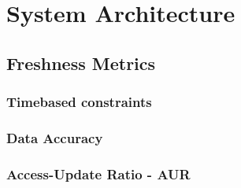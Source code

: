\chapter{System Architecture}
\label{c:architecture}


\section{Freshness Metrics}
\subsection{Timebased constraints}
\subsection{Data Accuracy}
\subsection{Access-Update Ratio - AUR}